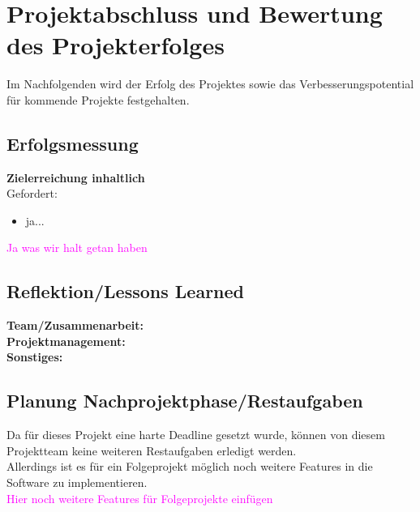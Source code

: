 \chapter{Projektabschluss und Bewertung des Projekterfolges}

\label{sec:Chap7}

Im Nachfolgenden wird der Erfolg des Projektes sowie das Verbesserungspotential für kommende Projekte festgehalten.

\section{Erfolgsmessung}

\textbf{Zielerreichung inhaltlich} \\
Gefordert:
\begin{itemize}
\item ja...
\end{itemize}

\textcolor{magenta}{Ja was wir halt getan haben}

\section{Reflektion/Lessons Learned}

\textbf{Team/Zusammenarbeit:}\\

\textbf{Projektmanagement:}\\

\textbf{Sonstiges:}\\

\section{Planung Nachprojektphase/Restaufgaben}

Da für dieses Projekt eine harte Deadline gesetzt wurde, können von diesem Projektteam keine weiteren Restaufgaben erledigt werden. \\
Allerdings ist es für ein Folgeprojekt möglich noch weitere Features in die Software zu implementieren. \\
\textcolor{magenta}{Hier noch weitere Features für Folgeprojekte einfügen}